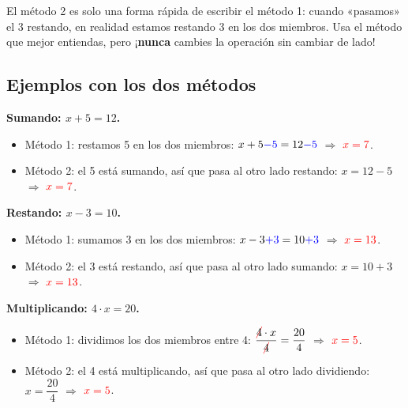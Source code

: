 \begin{impt}
    El método 2 es solo una forma rápida de escribir el método 1: cuando «pasamos» el 3 restando, en realidad estamos restando 3 en los dos miembros. Usa el método que mejor entiendas, pero ¡\textbf{nunca} cambies la operación sin cambiar de lado!
\end{impt}

\subsection{Ejemplos con los dos métodos}

\begin{example}
    \textbf{Sumando: \(x + 5 = 12\).}
    \begin{itemize}
        \item Método 1: restamos 5 en los dos miembros: \(x + 5 \textcolor{blue}{- 5} = 12 \textcolor{blue}{- 5}\) \(\Rightarrow\) \(\textcolor{red}{x = 7}\).
        \item Método 2: el 5 está sumando, así que pasa al otro lado restando: \(x = 12 - 5\) \(\Rightarrow\) \(\textcolor{red}{x = 7}\).
    \end{itemize}
\end{example}

\begin{example}
    \textbf{Restando: \(x - 3 = 10\).}
    \begin{itemize}
        \item Método 1: sumamos 3 en los dos miembros: \(x - 3 \textcolor{blue}{+ 3} = 10 \textcolor{blue}{+ 3}\) \(\Rightarrow\) \(\textcolor{red}{x = 13}\).
        \item Método 2: el 3 está restando, así que pasa al otro lado sumando: \(x = 10 + 3\) \(\Rightarrow\) \(\textcolor{red}{x = 13}\).
    \end{itemize}
\end{example}

\begin{example}
    \textbf{Multiplicando: \(4 \cdot x = 20\).}
    \begin{itemize}
        \item Método 1: dividimos los dos miembros entre 4: \(\dfrac{\cancelred{4} \cdot x}{\cancelred{4}} = \dfrac{20}{4}\) \(\Rightarrow\) \(\textcolor{red}{x = 5}\).
        \item Método 2: el 4 está multiplicando, así que pasa al otro lado dividiendo: \(x = \dfrac{20}{4}\) \(\Rightarrow\) \(\textcolor{red}{x = 5}\).
    \end{itemize}
\end{example}

